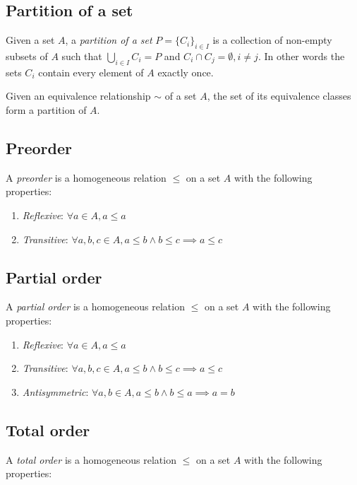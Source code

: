 \documentclass[a4paper]{article}
\begin{document}
\subsection{Partition of a set}

Given a set \(A\), a \textit{partition of a set} \(P={\{C_i\}}_{i\in I}\) is a collection of
non-empty subsets of \(A\) such that \(\bigcup_{i\in I} C_i = P\) and
\(C_i \cap C_j = \emptyset, i \neq j\). In other words the sets \(C_i\)
contain every element of \(A\) exactly once.

Given an equivalence relationship \(\sim\) of a set \(A\),
the set of its equivalence classes form a partition of \(A\).

\subsection{Preorder}

A \textit{preorder} is a homogeneous relation \(\leq\) on a set \(A\)
with the following properties:
\begin{enumerate}
    \item \textit{Reflexive}: \(\forall a \in A, a \leq a\)
    \item \textit{Transitive}: \(\forall a,b,c \in A, a \leq b \land b \leq c \implies a \leq c\)
\end{enumerate}

\subsection{Partial order}

A \textit{partial order} is a homogeneous relation \(\leq\) on a set \(A\)
with the following properties:
\begin{enumerate}
    \item \textit{Reflexive}: \(\forall a \in A, a \leq a\)
    \item \textit{Transitive}: \(\forall a,b,c \in A, a \leq b \land b \leq c \implies a \leq c\)
    \item \textit{Antisymmetric}: \(\forall a,b \in A, a \leq b \land b \leq a \implies a=b\)
\end{enumerate}

\subsection{Total order}

A \textit{total order} is a homogeneous relation \(\leq\) on a set \(A\)
with the following properties:
\end{document}
